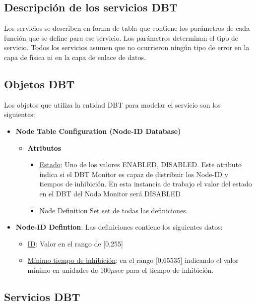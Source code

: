\subsection{Descripción de los servicios DBT}
Los servicios se describen en forma de tabla que contiene los parámetros de
cada función que se define para ese servicio. Los parámetros determinan el tipo
de servicio.  Todos los servicios asumen que no ocurrieron ningún tipo de error
en la capa de física ni en la capa de enlace de datos.

\subsection{Objetos DBT}
Los objetos que utiliza la entidad DBT para modelar el servicio son los
siguientes:
\begin{itemize}
\item \textbf{Node Table Configuration (Node-ID Database)}
  \begin{itemize}
  \item \textbf{Atributos}
    \begin{itemize}
    \item \underline{Estado}: Uno de los valores {ENABLED, DISABLED}. Este
      atributo indica si el DBT Monitor es capaz de distribuir los Node-ID
      y tiempos de inhibición. En esta instancia de trabajo el valor del estado
      en el DBT del Nodo Monitor será DISABLED
      \item \underline{Node Definition Set} set de todas las definiciones. 
    \end{itemize}
  \end{itemize}

\item \textbf{Node-ID Defintion}:
  Las definiciones contiene los siguientes datos:
  \begin{itemize}
  \item \underline{ID}: Valor en el rango de [0,255]
  \item \underline{Mínimo tiempo de inhibición}: en el rango [0,65535] indicando
    el valor mínimo en unidades de 100$\mu$sec para el tiempo de inhibición.
  \end{itemize}
  
\end{itemize}

\subsection{Servicios DBT}\label{subsection:servicios_dbt}
